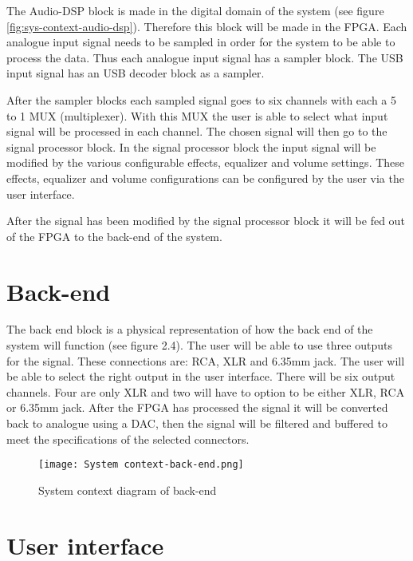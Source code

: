 The Audio-DSP block is made in the digital domain of the system (see figure \ref{fig:sys-context-audio-dsp}). Therefore this block will be made in the FPGA. Each analogue input signal needs to be sampled in order for the system to be able to process the data. Thus each analogue input signal has a sampler block. The USB input signal has an USB decoder block as a sampler. 

After the sampler blocks each sampled signal goes to six channels with each a 5 to 1 MUX (multiplexer). With this MUX the user is able to select what input signal will be processed in each channel. The chosen signal will then go to the signal processor block. In the signal processor block the input signal will be modified by the various configurable effects, equalizer and volume settings. These effects, equalizer and volume configurations can be configured by the user via the user interface.

After the signal has been modified by the signal processor block it will be fed out of the FPGA to the back-end of the system.

\section{Back-end}

The back end block is a physical representation of how the back end of the system will function (see figure 2.4). The user will be able to use three outputs for the signal. These connections are: RCA, XLR and 6.35mm jack. The user will be able to select the right output in the user interface. There will be six output channels. Four are only XLR and two will have to option to be either XLR, RCA or 6.35mm jack. After the FPGA has processed the signal it will be converted back to analogue using a DAC, then the signal will be filtered and buffered to meet the specifications of the selected connectors.

\begin{figure}[ht]
    \texttt{[image: System context-back-end.png]}
    \caption{System context diagram of back-end}
    \label{fig:system-context-back-end}
\end{figure}

\section{User interface}
